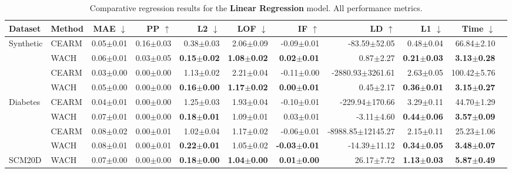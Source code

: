 \begin{table}[ht!]
\centering
\caption{Comparative regression results for the \textbf{Linear Regression} model. All performance metrics.}
\label{tab:regression_all_lr}
\begin{center}
\begin{sc}
\begin{tiny}
\begin{tabular}{@{}llrrrrrrrrr@{}}
\toprule
Dataset & Method & MAE $\downarrow$ & PP $\uparrow$ & L2 $\downarrow$ & LOF $\downarrow$ & IF $\uparrow$ & LD $\uparrow$ & L1 $\downarrow$ & Time $\downarrow$ \\
\midrule
\multirow[t]{3}{*}{Synthetic} & CEARM & 0.05$\pm$0.01 & 0.16$\pm$0.03 & 0.38$\pm$0.03 & 2.06$\pm$0.09 & -0.09$\pm$0.01 & -83.59$\pm$52.05 & 0.48$\pm$0.04 & 66.84$\pm$2.10 \\
 & WACH & 0.06$\pm$0.01 & 0.03$\pm$0.05 & \textbf{0.15$\pm$0.02} & \textbf{1.08$\pm$0.02} & \textbf{0.02$\pm$0.01} & 0.87$\pm$2.27 & \textbf{0.21$\pm$0.03} & \textbf{3.13$\pm$0.28} \\
\midrule
\multirow[t]{3}{*}{Concrete} & CEARM & 0.03$\pm$0.00 & 0.00$\pm$0.00 & 1.13$\pm$0.02 & 2.21$\pm$0.04 & -0.11$\pm$0.00 & -2880.93$\pm$3261.61 & 2.63$\pm$0.05 & 100.42$\pm$5.76 \\
 & WACH & 0.05$\pm$0.00 & 0.00$\pm$0.00 & \textbf{0.16$\pm$0.00} & \textbf{1.17$\pm$0.02} & \textbf{0.00$\pm$0.01} & 0.45$\pm$2.17 & \textbf{0.36$\pm$0.01} & \textbf{3.15$\pm$0.27} \\
\midrule
\multirow[t]{3}{*}{Diabetes} & CEARM & 0.04$\pm$0.01 & 0.00$\pm$0.00 & 1.25$\pm$0.03 & 1.93$\pm$0.04 & -0.10$\pm$0.01 & -229.94$\pm$170.66 & 3.29$\pm$0.11 & 44.70$\pm$1.29 \\
 & WACH & 0.07$\pm$0.01 & 0.00$\pm$0.00 & \textbf{0.18$\pm$0.01} & 1.09$\pm$0.01 & 0.03$\pm$0.01 & -3.11$\pm$4.60 & \textbf{0.44$\pm$0.06} & \textbf{3.57$\pm$0.09} \\
\midrule
\multirow[t]{3}{*}{Yacht} & CEARM & 0.08$\pm$0.02 & 0.00$\pm$0.01 & 1.02$\pm$0.04 & 1.17$\pm$0.02 & -0.06$\pm$0.01 & -8988.85$\pm$12145.27 & 2.15$\pm$0.11 & 25.23$\pm$1.06 \\
 & WACH & 0.08$\pm$0.01 & 0.00$\pm$0.01 & \textbf{0.22$\pm$0.01} & 1.05$\pm$0.02 & \textbf{-0.03$\pm$0.01} & -14.39$\pm$11.12 & \textbf{0.34$\pm$0.05} & \textbf{3.48$\pm$0.07} \\
\midrule
\multirow[t]{2}{*}{SCM20D} & WACH & 0.07$\pm$0.00 & 0.00$\pm$0.00 & \textbf{0.18$\pm$0.00} & \textbf{1.04$\pm$0.00} & \textbf{0.01$\pm$0.00} & 26.17$\pm$7.72 & \textbf{1.13$\pm$0.03} & \textbf{5.87$\pm$0.49} \\
\bottomrule
\end{tabular}
\end{tiny}
\end{sc}
\end{center}
\end{table}

